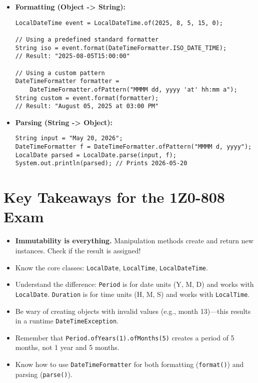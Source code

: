 \documentclass[12pt]{article}
\begin{document}
\begin{enumerate}[label=(\arabic*)]
\begin{itemize}
    \item \textbf{Formatting (Object -> String):}
    \begin{verbatim}
LocalDateTime event = LocalDateTime.of(2025, 8, 5, 15, 0);

// Using a predefined standard formatter
String iso = event.format(DateTimeFormatter.ISO_DATE_TIME);
// Result: "2025-08-05T15:00:00"

// Using a custom pattern
DateTimeFormatter formatter = 
    DateTimeFormatter.ofPattern("MMMM dd, yyyy 'at' hh:mm a");
String custom = event.format(formatter);
// Result: "August 05, 2025 at 03:00 PM"
    \end{verbatim}

    \item \textbf{Parsing (String -> Object):}
    \begin{verbatim}
String input = "May 20, 2026";
DateTimeFormatter f = DateTimeFormatter.ofPattern("MMMM d, yyyy");
LocalDate parsed = LocalDate.parse(input, f);
System.out.println(parsed); // Prints 2026-05-20
    \end{verbatim}
\end{itemize}

\section*{Key Takeaways for the 1Z0-808 Exam}
\begin{itemize}
    \item \textbf{Immutability is everything.} Manipulation methods create and return new instances. Check if the result is assigned!
    \item Know the core classes: \texttt{LocalDate}, \texttt{LocalTime}, \texttt{LocalDateTime}.
    \item Understand the difference: \texttt{Period} is for date units (Y, M, D) and works with \texttt{LocalDate}. \texttt{Duration} is for time units (H, M, S) and works with \texttt{LocalTime}.
    \item Be wary of creating objects with invalid values (e.g., month 13)---this results in a runtime \texttt{DateTimeException}.
    \item Remember that \texttt{Period.ofYears(1).ofMonths(5)} creates a period of 5 months, not 1 year and 5 months.
    \item Know how to use \texttt{DateTimeFormatter} for both formatting (\texttt{format()}) and parsing (\texttt{parse()}).
\end{itemize}
\end{enumerate}
\end{document}
